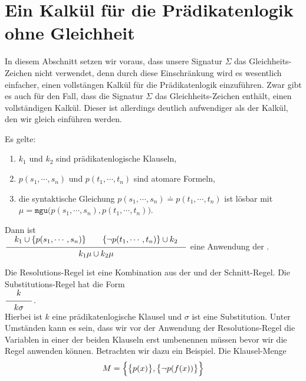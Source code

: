 \section{Ein Kalkül für die Prädikatenlogik ohne Gleichheit \label{sec:fol-calculus}}
In diesem Abschnitt setzen wir voraus, dass unsere Signatur $\Sigma$ das Gleichheits-Zeichen nicht
verwendet, denn durch diese Einschränkung wird es wesentlich einfacher, einen vollstängen Kalkül für
die Prädikatenlogik einzuführen.  Zwar gibt es auch für den Fall, dass die Signatur $\Sigma$ das
Gleichheits-Zeichen enthält, einen vollständigen Kalkül.  Dieser ist allerdings deutlich
aufwendiger als der Kalkül, den wir gleich einführen werden.

\begin{Definition}  
    Es gelte:
    \begin{enumerate}
    \item $k_1$ und $k_2$ sind prädikatenlogische Klauseln,
    \item $p(s_1,\cdots,s_n)$ und $p(t_1,\cdots,t_n)$ sind atomare Formeln,
    \item die syntaktische Gleichung $p(s_1,\cdots,s_n)  \doteq p(t_1,\cdots,t_n)$ ist lösbar mit 
          \\[0.2cm]
          \hspace*{1.3cm}
          $\mu = \mathtt{mgu}\bigl(p(s_1,\cdots,s_n), p(t_1,\cdots,t_n)\bigr)$. 
    \end{enumerate}
     Dann ist 
     \\[0.2cm]
     \hspace*{1.3cm}
     $\schluss{k_1 \cup\{ p(s_1,\cdots,s_n)\} \quad\quad \{\neg p(t_1,\cdots,t_n)\} \cup k_2}{
                 k_1\mu \cup k_2\mu} 
     $
     eine Anwendung der .
     \eox
\end{Definition}
Die Resolutions-Regel ist eine Kombination aus der  und der 
Schnitt-Regel.  Die Substitutions-Regel  hat die Form
\\[0.2cm]
\hspace*{1.3cm}
$\schluss{k}{k\sigma}$. 
\\[0.2cm]
Hierbei ist $k$ eine prädikatenlogische Klausel und $\sigma$ ist eine Substitution.
Unter Umständen kann es sein, dass wir vor der Anwendung der Resolutions-Regel 
die Variablen in einer der beiden Klauseln erst umbenennen
müssen bevor wir die Regel anwenden können.  Betrachten wir dazu ein Beispiel.
Die Klausel-Menge 
\[ M = \Bigl\{ \bigl\{ p(x) \bigr\}, \bigl\{ \neg p(f(x)) \bigr\} \Bigr\} \]
